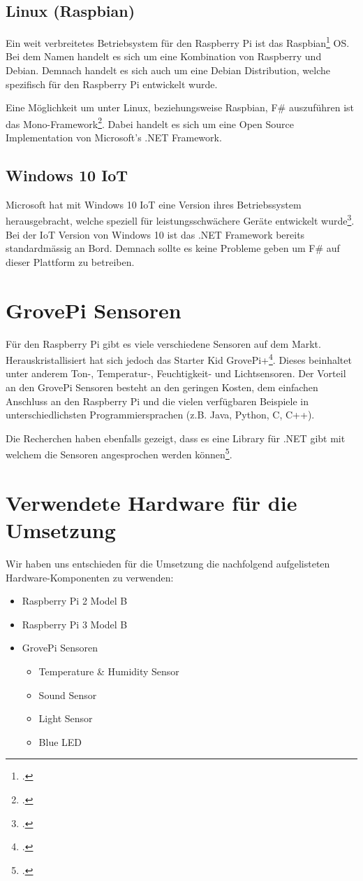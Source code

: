 \subsection{Linux (Raspbian)}
Ein weit verbreitetes Betriebsystem für den Raspberry Pi ist das Raspbian\footcite{FrontPage_-_Raspbian_2016-04-24} OS. Bei dem Namen handelt es sich um eine Kombination von Raspberry und Debian. Demnach handelt es sich auch um eine Debian Distribution, welche spezifisch für den Raspberry Pi entwickelt wurde.

Eine Möglichkeit um unter Linux, beziehungsweise Raspbian, F\# auszuführen ist das Mono-Framework\footcite{Mono_2016-04-24}. Dabei handelt es sich um eine Open Source Implementation von Microsoft's .NET Framework.

\subsection{Windows 10 IoT}
Microsoft hat mit Windows 10 IoT eine Version ihres Betriebssystem herausgebracht, welche speziell für leistungsschwächere Geräte entwickelt wurde\footcite{Windows_IoT_2016-04-24}. Bei der IoT Version von Windows 10 ist das .NET Framework bereits standardmässig an Bord. Demnach sollte es keine Probleme geben um F\# auf dieser Plattform zu betreiben.

\section{GrovePi Sensoren}
Für den Raspberry Pi gibt es viele verschiedene Sensoren auf dem Markt. Herauskristallisiert hat sich jedoch das Starter Kid GrovePi+\footcite{GrovePi_2016-04-24}. Dieses beinhaltet unter anderem Ton-, Temperatur-, Feuchtigkeit- und Lichtsensoren. Der Vorteil an den GrovePi Sensoren besteht an den geringen Kosten, dem einfachen Anschluss an den Raspberry Pi und die vielen verfügbaren Beispiele in unterschiedlichsten Programmiersprachen (z.B. Java, Python, C, C++).

Die Recherchen haben ebenfalls gezeigt, dass es eine Library für .NET gibt mit welchem die Sensoren angesprochen werden können\footcite{NuGet_GrovePi_2016-04-24}.

\section{Verwendete Hardware für die Umsetzung}
Wir haben uns entschieden für die Umsetzung die nachfolgend aufgelisteten Hardware-Komponenten zu verwenden:
\begin{itemize}
\item Raspberry Pi 2 Model B
\item Raspberry Pi 3 Model B
\item GrovePi Sensoren
\begin{itemize}
\item Temperature \& Humidity Sensor
\item Sound Sensor
\item Light Sensor
\item Blue LED
\end{itemize}
\end{itemize}






